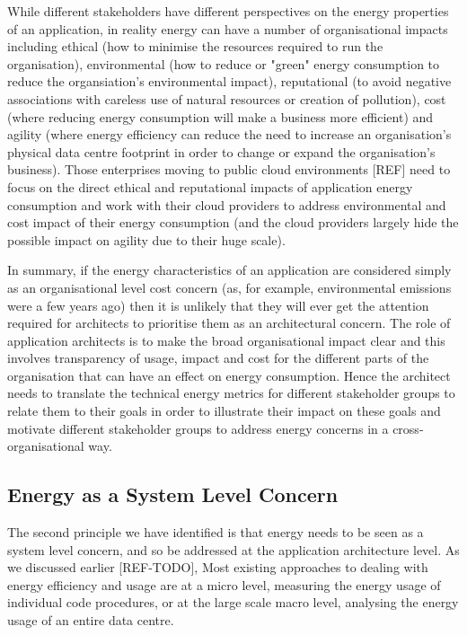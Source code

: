 While different stakeholders have different perspectives on the energy properties of an application, in reality energy can have a number of organisational impacts including ethical (how to minimise the resources required to run the organisation), environmental (how to reduce or "green" energy consumption to reduce the organsiation's environmental impact), reputational (to avoid negative associations with careless use of natural resources or creation of pollution), cost (where reducing energy consumption will make a business more efficient) and agility (where energy efficiency can reduce the need to increase an organisation's physical data centre footprint in order to change or expand the organisation's business).  Those enterprises moving to public cloud environments [REF] need to focus on the direct ethical and reputational impacts of application energy consumption and work with their cloud providers to address environmental and cost impact of their energy consumption (and the cloud providers largely hide the possible impact on agility due to their huge scale). 

In summary, if the energy characteristics of an application are considered simply as an organisational level cost concern (as, for example, environmental emissions were a few years ago) then it is unlikely that they will ever get the attention required for architects to prioritise them as an architectural concern.  The role of application architects is to make the broad organisational impact clear and this involves transparency of usage, impact and cost for the different parts of the organisation that can have an effect on energy consumption.  Hence the architect needs to translate the technical energy metrics for different stakeholder groups to relate them to their goals in order to illustrate their impact on these goals and motivate different stakeholder groups to address energy concerns in a cross-organisational way. 

\subsection{Energy as a System Level Concern}

The second principle we have identified is that energy needs to be seen as a system level concern, and so be addressed at the application architecture level.  As we discussed earlier [REF-TODO], Most existing approaches to dealing with energy efficiency and usage are at a micro level, measuring the energy usage of individual code procedures, or at the large scale macro level, analysing the energy usage of an entire data centre.  

